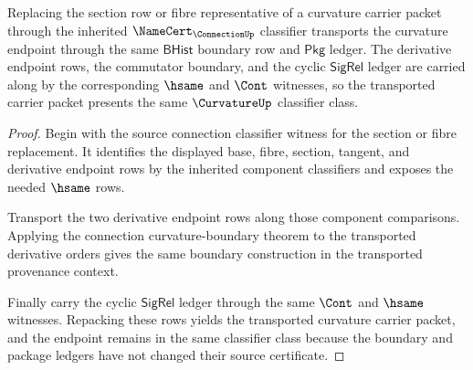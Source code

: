 \begin{theorem}
\label{thm:curvature-tensorial-section-change-row}
Replacing the section row or fibre representative of a curvature carrier packet through the inherited $\NameCert_{\ConnectionUp}$ classifier transports the curvature endpoint through the same $\mathsf{BHist}$ boundary row and $\mathsf{Pkg}$ ledger. The derivative endpoint rows, the commutator boundary, and the cyclic $\mathsf{SigRel}$ ledger are carried along by the corresponding $\hsame$ and $\Cont$ witnesses, so the transported carrier packet presents the same $\CurvatureUp$ classifier class.
\end{theorem}
\begin{proof}
Begin with the source connection classifier witness for the section or fibre replacement. It identifies the displayed base, fibre, section, tangent, and derivative endpoint rows by the inherited component classifiers and exposes the needed $\hsame$ rows.

Transport the two derivative endpoint rows along those component comparisons. Applying the connection curvature-boundary theorem to the transported derivative orders gives the same boundary construction in the transported provenance context.

Finally carry the cyclic $\mathsf{SigRel}$ ledger through the same $\Cont$ and $\hsame$ witnesses. Repacking these rows yields the transported curvature carrier packet, and the endpoint remains in the same classifier class because the boundary and package ledgers have not changed their source certificate.
\end{proof}

